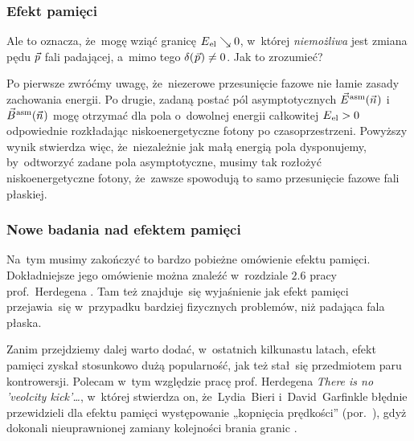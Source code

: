 \documentclass[10pt,t]{beamer}
\begin{document}
\begin{frame}
  \frametitle{Efekt pamięci}


  Ale to oznacza, że~mogę wziąć granicę $E_{ \hspace{0.05em} \text{el} } \searrow 0$,
  w~której \textit{niemożliwa} jest zmiana pędu $\vec{p}$ fali padającej,
  a~mimo tego $\delta( \hspace{0.05em} \vec{p} \hspace{0.05em} ) \neq 0$. Jak to zrozumieć?

  Po pierwsze zwróćmy uwagę, że~niezerowe przesunięcie fazowe nie łamie
  zasady zachowania energii. Po drugie, zadaną postać pól asymptotycznych
  $\vec{E}^{ \hspace{0.05em} \text{asm} }( \vec{n} \hspace{0.05em} )$ i~$\vec{B}^{ \hspace{0.05em} \text{asm} }( \vec{n} \hspace{0.05em} )$ mogę otrzymać dla pola o~dowolnej energii
  całkowitej $E_{ \hspace{0.05em} \text{el} } > 0$ odpowiednie rozkładając
  niskoenergetyczne fotony po czasoprzestrzeni. Powyższy wynik stwierdza
  więc, że~niezależnie jak małą energią pola dysponujemy, by~odtworzyć
  zadane pola asymptotyczne, musimy tak rozłożyć niskoenergetyczne fotony,
  że~zawsze spowodują to samo przesunięcie fazowe fali płaskiej.


\end{frame}





\begin{frame}
  \frametitle{Nowe badania nad efektem pamięci}


  Na~tym musimy zakończyć to bardzo pobieżne omówienie efektu pamięci.
  Dokładniejsze jego omówienie można znaleźć w~rozdziale $2.6$ pracy
  prof.~Herdegena
  \parencite{Herdegen-Infrared-structure-beyond-locality-ETC-Ver-2024}. Tam
  też znajduje~się wyjaśnienie jak efekt pamięci przejawia~się w~przypadku
  bardziej fizycznych problemów, niż padająca fala płaska.

  Zanim przejdziemy dalej warto dodać, w~ostatnich
  kilkunastu latach, efekt pamięci zyskał stosunkowo dużą popularność, jak
  też stał~się przedmiotem paru kontrowersji. Polecam w~tym względzie pracę
  prof. Herdegena
  {\textit{There is no 'veolcity kick'\ldots}}, w~której stwierdza on,
  że~Lydia~Bieri i~David~Garfinkle błędnie przewidzieli dla efektu pamięci
  występowanie „kopnięcia prędkości”
  (por.~\parencite{Bieri-Garfinkle-An-electromagnetic-analogue-of-ETC-Pub-2013}),
  gdyż dokonali nieuprawnionej zamiany kolejności brania granic
  \parencite{Herdegen-There-Is-No-Velocity-Kick-Memory-ETC-Pub-2024}.

\end{frame}
\end{document}
